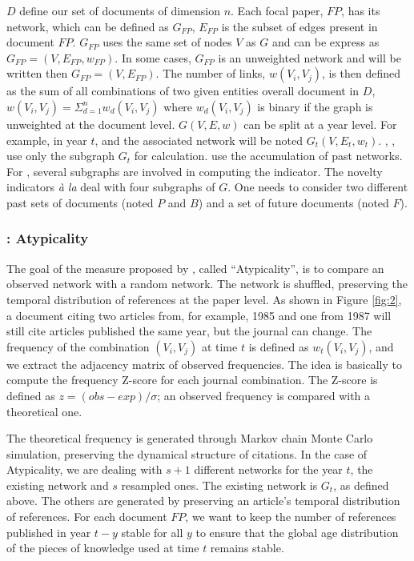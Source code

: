 $D$ define our set of documents of dimension $n$. Each focal paper, $FP$, has its network, which can be defined as $G_{FP}$, $E_{FP}$ is the subset of edges present in document $FP$. $G_{FP}$ uses the same set of nodes $V$ as $G$ and can be express as $G_{FP}=(V,E_{FP},w_{FP})$. In some cases, $G_{FP}$ is an unweighted network and will be written then $G_{FP}=(V, E_{FP})$. The number of links, $w(V_{i}, V_{j})$, is then defined as the sum of all combinations of two given entities overall document in $D$, $w({V_i, V_j})=\Sigma_{d=1}^{n}w_{d}(V_{i}, V_{j})$ where $w_{d}(V_{i}, V_{j})$ is binary if the graph is unweighted at the document level. 
$G(V,E,w)$ can be split at a year level. For example, in year $t$, and the associated network will be noted $G_t(V, E_t,w_t)$. \cite{uzzi2013atypical}, \cite{lee2015creativity}, use only the subgraph $G_t$ for calculation. \cite{foster2015tradition} use the accumulation of past networks. For \cite{wang2017bias}, several subgraphs are involved in computing the indicator. The novelty indicators \textit{à la} \cite{wang2017bias} deal with four subgraphs of $G$. One needs to consider two different past sets of documents (noted $P$ and $B$) and a set of future documents (noted $F$). 


\subsubsection{\cite{uzzi2013atypical}: Atypicality}

The goal of the measure proposed by \cite{uzzi2013atypical}, called ``Atypicality'', is to compare an observed network with a random network. The network is shuffled, preserving the temporal distribution of references at the paper level. As shown in Figure \ref{fig:2}, a document citing two articles from, for example, 1985 and one from 1987 will still cite articles published the same year, but the journal can change. The frequency of the combination $(V_i, V_j)$ at time $t$ is defined as $w_t(V_i, V_j)$, and we extract the adjacency matrix of observed frequencies. The idea is basically to compute the frequency Z-score for each journal combination. The Z-score is defined as $z=(obs-exp)/\sigma$; an observed frequency is compared with a theoretical one.

The theoretical frequency is generated through Markov chain Monte Carlo simulation, preserving the dynamical structure of citations. In the case of Atypicality, we are dealing with $s+1$ different networks for the year $t$, the existing network and $s$ resampled ones. The existing network is $G_t$, as defined above. The others are generated by preserving an article's temporal distribution of references. For each document $FP$, we want to keep the number of references published in year $t-y$
stable for all $y$ to ensure that the global age distribution of the pieces of knowledge used at time $t$ remains stable.

